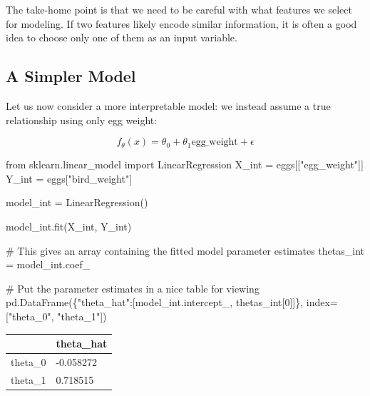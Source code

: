 \documentclass[
  letterpaper,
  DIV=11,
  numbers=noendperiod]{scrreprt}
\newenvironment{Shaded}{\begin{snugshade}}{\end{snugshade}}
\newcommand{\CommentTok}[1]{\textcolor[rgb]{0.37,0.37,0.37}{#1}}
\newcommand{\DecValTok}[1]{\textcolor[rgb]{0.68,0.00,0.00}{#1}}
\newcommand{\ImportTok}[1]{\textcolor[rgb]{0.00,0.46,0.62}{#1}}
\newcommand{\NormalTok}[1]{\textcolor[rgb]{0.00,0.23,0.31}{#1}}
\newcommand{\OperatorTok}[1]{\textcolor[rgb]{0.37,0.37,0.37}{#1}}
\newcommand{\StringTok}[1]{\textcolor[rgb]{0.13,0.47,0.30}{#1}}
\begin{document}
The take-home point is that we need to be careful with what features we
select for modeling. If two features likely encode similar information,
it is often a good idea to choose only one of them as an input variable.

\subsection{A Simpler Model}\label{a-simpler-model}

Let us now consider a more interpretable model: we instead assume a true
relationship using only egg weight:

\[f_\theta(x) = \theta_0 + \theta_1 \text{egg\_weight} + \epsilon\]

\begin{Shaded}
\begin{Highlighting}[]
\ImportTok{from}\NormalTok{ sklearn.linear\_model }\ImportTok{import}\NormalTok{ LinearRegression}
\NormalTok{X\_int }\OperatorTok{=}\NormalTok{ eggs[[}\StringTok{"egg\_weight"}\NormalTok{]]}
\NormalTok{Y\_int }\OperatorTok{=}\NormalTok{ eggs[}\StringTok{"bird\_weight"}\NormalTok{]}

\NormalTok{model\_int }\OperatorTok{=}\NormalTok{ LinearRegression()}

\NormalTok{model\_int.fit(X\_int, Y\_int)}

\CommentTok{\# This gives an array containing the fitted model parameter estimates}
\NormalTok{thetas\_int }\OperatorTok{=}\NormalTok{ model\_int.coef\_}

\CommentTok{\# Put the parameter estimates in a nice table for viewing}
\NormalTok{pd.DataFrame(\{}\StringTok{"theta\_hat"}\NormalTok{:[model\_int.intercept\_, thetas\_int[}\DecValTok{0}\NormalTok{]]\}, index}\OperatorTok{=}\NormalTok{[}\StringTok{"theta\_0"}\NormalTok{, }\StringTok{"theta\_1"}\NormalTok{])}
\end{Highlighting}
\end{Shaded}

\begin{longtable}[]{@{}ll@{}}
\toprule\noalign{}
& theta\_hat \\
\midrule\noalign{}
\endhead
\bottomrule\noalign{}
\endlastfoot
theta\_0 & -0.058272 \\
theta\_1 & 0.718515 \\
\end{longtable}
\end{document}
